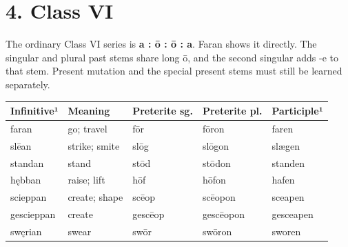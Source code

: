 \section*{4. Class VI}

The ordinary Class VI series is \textbf{a : ō : ō : a}. Faran shows it directly. The singular and plural past stems share long ō, and the second singular adds -e to that stem. Present mutation and the special present stems must still be learned separately.

\par\begingroup
\fontsize{10.5}{13.2}\selectfont
\setlength{\LTleft}{0pt}\setlength{\LTright}{\fill}
\noindent
\begin{tabular}{@{}>{\raggedright\arraybackslash}p{23.14mm}>{\raggedright\arraybackslash}p{21.04mm}>{\raggedright\arraybackslash}p{22.72mm}>{\raggedright\arraybackslash}p{22.72mm}>{\raggedright\arraybackslash}p{23.14mm}@{}}
\toprule
\textbf{Infinitive¹} & \textbf{Meaning} & \textbf{Preterite sg.} & \textbf{Preterite pl.} & \textbf{Participle¹} \\
\midrule
faran & go; travel & fōr & fōron & faren \\
slēan & strike; smite & slōg & slōgon & slægen \\
standan & stand & stōd & stōdon & standen \\
hębban & raise; lift & hōf & hōfon & hafen \\
scieppan & create; shape & scēop & scēopon & sceapen \\
gescieppan & create & gescēop & gescēopon & gesceapen \\
swęrian & swear & swōr & swōron & sworen \\
\bottomrule
\end{tabular}
\par\endgroup


